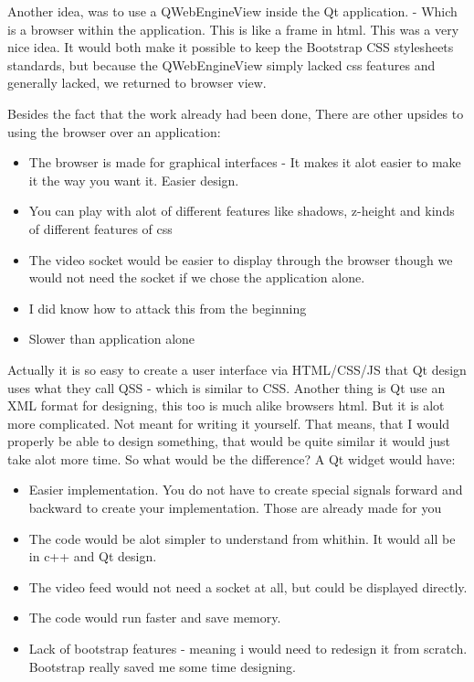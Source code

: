 Another idea, was to use a QWebEngineView inside the Qt application. - Which is a browser within the application. This is like a frame in html.
This was a very nice idea. It would both make it possible to keep the Bootstrap CSS stylesheets standards, 
but because the QWebEngineView simply lacked css features and generally lacked, we returned to browser view.

Besides the fact that the work already had been done, There are other upsides to using the browser over an application:
\begin{itemize}
    \item The browser is made for graphical interfaces - It makes it alot easier to make it the way you want it. Easier design.
    \item You can play with alot of different features like shadows, z-height and kinds of different features of css
    \item The video socket would be easier to display through the browser though we would not need the socket if we chose the application alone.
    \item I did know how to attack this from the beginning
    \item Slower than application alone
\end{itemize}
Actually it is so easy to create a user interface via HTML/CSS/JS that Qt design uses what they call QSS - which is similar to CSS. 
Another thing is Qt use an XML format for designing, this too is much alike browsers html. But it is alot more complicated. Not meant for writing it yourself.
That means, that I would properly be able to design something, that would be quite similar it would just take alot more time. So what would be the difference?
A Qt widget would have:
\begin{itemize}
    \item Easier implementation. You do not have to create special signals forward and backward to create your implementation. Those are already made for you
    \item The code would be alot simpler to understand from whithin. It would all be in c++ and Qt design.
    \item The video feed would not need a socket at all, but could be displayed directly.
    \item The code would run faster and save memory.
    \item Lack of bootstrap features - meaning i would need to redesign it from scratch. Bootstrap really saved me some time designing.
\end{itemize}

